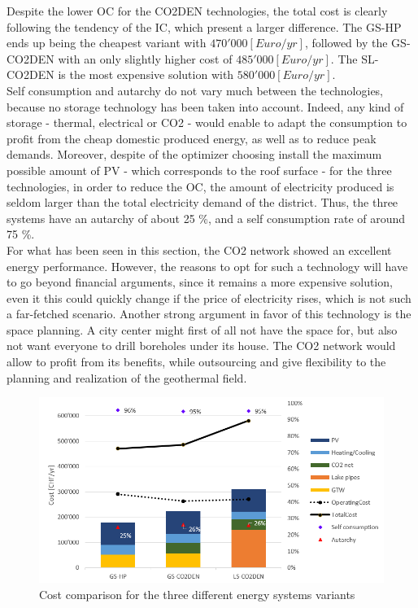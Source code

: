 \documentclass{article}
\begin{document}
Despite the lower OC for the CO2DEN technologies, the total cost is clearly following the tendency of the IC, which present a larger difference. The GS-HP ends up being the cheapest variant with $470'000 [Euro/yr]$, followed by the GS-CO2DEN with an only slightly higher cost of $485'000 [Euro/yr]$. The SL-CO2DEN is the most expensive solution with $580'000 [Euro/yr]$.\\

Self consumption and autarchy do not vary much between the technologies, because no storage technology has been taken into account. Indeed, any kind of storage - thermal, electrical or CO2 - would enable to adapt the consumption to profit from the cheap domestic produced energy, as well as to reduce peak demands. Moreover, despite of the optimizer choosing install the maximum possible amount of PV - which corresponds to the roof surface - for the three technologies, in order to reduce the OC, the amount of electricity produced is seldom larger than the total electricity demand of the district. Thus, the three systems have an autarchy of about 25 \%, and a self consumption rate of around 75 \%.\\

For what has been seen in this section, the CO2 network showed an excellent energy performance. However, the reasons to opt for such a technology will have to go beyond financial arguments, since it remains a more expensive solution, even it this could quickly change if the price of electricity rises, which is not such a far-fetched scenario. Another strong argument in favor of this technology is the space planning. A city center might first of all not have the space for, but also not want everyone to drill boreholes under its house. The CO2 network would allow to profit from its benefits, while outsourcing and give flexibility to the planning and realization of the geothermal field.

\begin{figure}[htp]
	\centering
	\includegraphics[width=1\textwidth]{V_costs.PNG}
	\caption{Cost comparison for the three different energy systems variants}
	\label{fig:V_costs}
\end{figure}
\end{document}
